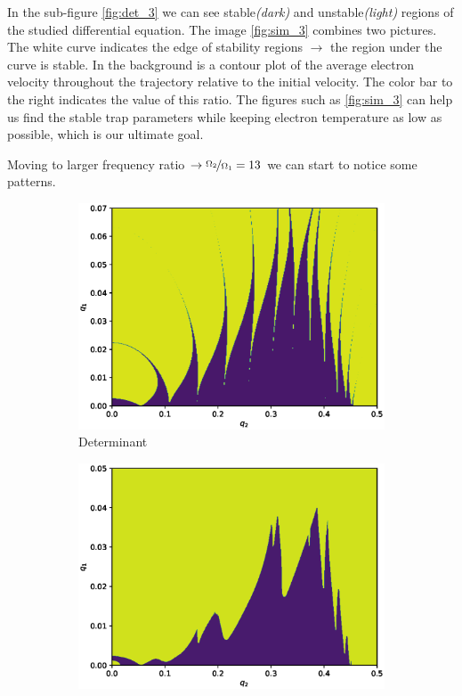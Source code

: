 In the sub-figure \ref{fig:det_3} we can see stable\textit{(dark)} and unstable\textit{(light)} regions of the studied differential equation. The image \ref{fig:sim_3} combines two pictures. The white curve indicates the edge of stability regions $\rightarrow$ the region under the curve is stable. In the background is a contour plot of the average electron velocity throughout the trajectory relative to the initial velocity. The color bar to the right indicates the value of this ratio. The figures such as \ref{fig:sim_3} can help us find the stable trap parameters while keeping electron temperature as low as possible, which is our ultimate goal.

Moving to larger frequency ratio $\rightarrow \nicefrac{\Omega_2}{\Omega_1} = 13$ we can start to notice some patterns.

\begin{figure}[H]
\begin{subfigure}{.5\textwidth}
  \centering
  \includegraphics[width=\linewidth]{img/q1_0.0-0.07_q2_0.0-0.5_400x400_13.eps}
  \caption{Determinant}
  \label{fig:det_13}
\end{subfigure}%
\begin{subfigure}{.5\textwidth}
  \centering
  \includegraphics[width=\linewidth]{img/0_ions_1_electrons_q1_0.0-0.05_q2_0.0-0.5_640x640_13.eps}  

\end{subfigure}
\end{figure}
